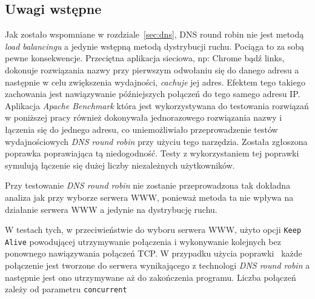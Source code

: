 \subsection{Uwagi wstępne}
Jak zostało wspomniane w rozdziale~\ref{sec:dns}, DNS round robin nie jest metodą \textit{load balancingu} a jedynie wstępną metodą dystrybucji ruchu.
Pociąga to za sobą pewne konsekwencje.
Przeciętna aplikacja sieciowa, np: Chrome bądź links, dokonuje rozwiązania nazwy przy pierwszym odwołaniu się do danego adresu a następnie w celu zwiększenia wydajności, \textit{cachuje} jej adres.
Efektem tego takiego zachowania jest nawiązywanie późniejszych połączeń do tego samego adresu IP\@.
Aplikacja \textit{Apache Benchmark}\cite{ab} która jest wykorzystywana do testowania rozwiązań w poniższej pracy również dokonywała jednorazowego rozwiązania nazwy i łączenia się do jednego adresu, co uniemożliwiało przeprowadzenie testów wydajnościowych \textit{DNS round robin} przy użyciu tego narzędzia.
Została zgłoszona poprawka\cite{ab_dnsrr} poprawiająca tą niedogodność.
Testy z wykorzystaniem tej poprawki symulują łączenie się dużej liczby niezależnych użytkowników.

Przy testowanie \textit{DNS round robin} nie zostanie przeprowadzona tak dokładna analiza jak przy wyborze serwera WWW, ponieważ metoda ta nie wpływa na działanie serwera WWW a jedynie na dystrybucję ruchu.

W testach tych, w przeciwieństwie do wyboru serwera WWW, użyto opcji \texttt{Keep Alive} powodującej utrzymywanie połączenia i wykonywanie kolejnych bez ponownego nawiązywania połączeń TCP\@.
W przypadku użycia poprawki~\cite{ab_dnsrr} każde połączenie jest tworzone do serwera wynikającego z technologi \textit{DNS round robin} a następnie jest ono utrzymywane aż do zakończenia programu. Liczba połączeń zależy od parametru \texttt{concurrent}

